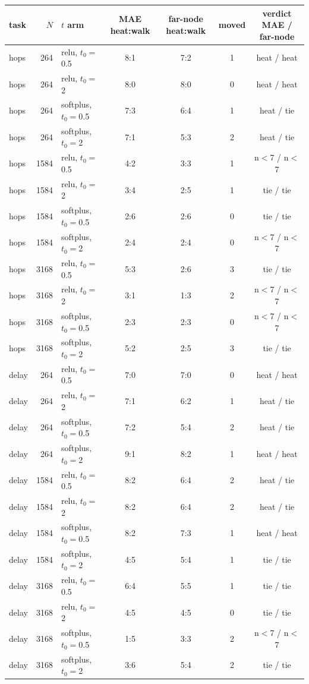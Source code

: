{\footnotesize\setlength{\tabcolsep}{3.5pt}
\begin{tabular}{@{}lrlcccc@{}}
\toprule
task & $N$ & $t$ arm & MAE heat:walk & far-node heat:walk & moved & verdict MAE / far-node \\
\midrule
hops & 264 & relu, $t_0{=}$0.5 & 8:1 & 7:2 & 1 & heat / heat \\
hops & 264 & relu, $t_0{=}$2 & 8:0 & 8:0 & 0 & heat / heat \\
hops & 264 & softplus, $t_0{=}$0.5 & 7:3 & 6:4 & 1 & heat / tie \\
hops & 264 & softplus, $t_0{=}$2 & 7:1 & 5:3 & 2 & heat / tie \\
hops & 1584 & relu, $t_0{=}$0.5 & 4:2 & 3:3 & 1 & n$<$7 / n$<$7 \\
hops & 1584 & relu, $t_0{=}$2 & 3:4 & 2:5 & 1 & tie / tie \\
hops & 1584 & softplus, $t_0{=}$0.5 & 2:6 & 2:6 & 0 & tie / tie \\
hops & 1584 & softplus, $t_0{=}$2 & 2:4 & 2:4 & 0 & n$<$7 / n$<$7 \\
hops & 3168 & relu, $t_0{=}$0.5 & 5:3 & 2:6 & 3 & tie / tie \\
hops & 3168 & relu, $t_0{=}$2 & 3:1 & 1:3 & 2 & n$<$7 / n$<$7 \\
hops & 3168 & softplus, $t_0{=}$0.5 & 2:3 & 2:3 & 0 & n$<$7 / n$<$7 \\
hops & 3168 & softplus, $t_0{=}$2 & 5:2 & 2:5 & 3 & tie / tie \\
delay & 264 & relu, $t_0{=}$0.5 & 7:0 & 7:0 & 0 & heat / heat \\
delay & 264 & relu, $t_0{=}$2 & 7:1 & 6:2 & 1 & heat / tie \\
delay & 264 & softplus, $t_0{=}$0.5 & 7:2 & 5:4 & 2 & heat / tie \\
delay & 264 & softplus, $t_0{=}$2 & 9:1 & 8:2 & 1 & heat / heat \\
delay & 1584 & relu, $t_0{=}$0.5 & 8:2 & 6:4 & 2 & heat / tie \\
delay & 1584 & relu, $t_0{=}$2 & 8:2 & 6:4 & 2 & heat / tie \\
delay & 1584 & softplus, $t_0{=}$0.5 & 8:2 & 7:3 & 1 & heat / heat \\
delay & 1584 & softplus, $t_0{=}$2 & 4:5 & 5:4 & 1 & tie / tie \\
delay & 3168 & relu, $t_0{=}$0.5 & 6:4 & 5:5 & 1 & tie / tie \\
delay & 3168 & relu, $t_0{=}$2 & 4:5 & 4:5 & 0 & tie / tie \\
delay & 3168 & softplus, $t_0{=}$0.5 & 1:5 & 3:3 & 2 & n$<$7 / n$<$7 \\
delay & 3168 & softplus, $t_0{=}$2 & 3:6 & 5:4 & 2 & tie / tie \\
\bottomrule
\end{tabular}
}
